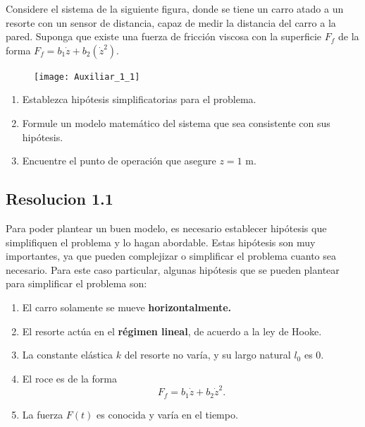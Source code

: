 \documentclass[
  11pt,
  letterpaper,
   addpoints,
   answers
  ]{exam}
\begin{document}
\begin{questions}
    \question Considere el sistema de la siguiente figura, donde se tiene un carro atado a un resorte con un sensor de distancia, capaz de medir la distancia del carro a la pared. Suponga que existe una fuerza de fricción viscosa con la superficie $F_f$ de la forma $F_f = b_1 \dot{z} + b_2 (\dot{z}^2)$.
    \begin{figure}[h!]
        \centering
        \texttt{[image: Auxiliar\_1\_1]}
    \end{figure}
    \begin{enumerate}
        \item Establezca hipótesis simplificatorias para el problema.
        \item Formule un modelo matemático del sistema que sea consistente con sus hipótesis.
        \item Encuentre el punto de operación que asegure $z = 1$ m.
    \end{enumerate}
    \begin{solution}
    \subsection*{Resolucion 1.1}
        Para poder plantear un buen modelo, es necesario establecer hipótesis que simplifiquen el problema y lo hagan abordable. Estas hipótesis son muy importantes, ya que pueden complejizar o simplificar el problema cuanto sea necesario. Para este caso particular, algunas hipótesis que se pueden plantear para simplificar el problema son:
\begin{enumerate}
    \item El carro solamente se mueve \textbf{horizontalmente.}
    \item El resorte actúa en el \textbf{régimen lineal}, de acuerdo a la ley de Hooke.
    \item La constante elástica $k$ del resorte no varía, y su largo natural $l_0$ es 0.
    \item El roce es de la forma 
    \begin{equation}
        F_f = b_1 \dot{z} + b_2 \dot{z}^2.
    \end{equation}
    \item La fuerza $F(t)$ es conocida y varía en el tiempo.
\end{enumerate}

\end{solution}
\end{questions}
\end{document}
